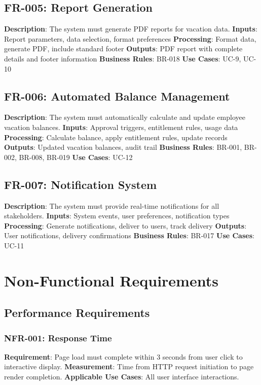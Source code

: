 \documentclass[12pt,a4paper]{article}
\begin{document}
\subsection{FR-005: Report Generation}
\textbf{Description}: The system must generate PDF reports for vacation data.
\textbf{Inputs}: Report parameters, data selection, format preferences
\textbf{Processing}: Format data, generate PDF, include standard footer
\textbf{Outputs}: PDF report with complete details and footer information
\textbf{Business Rules}: BR-018
\textbf{Use Cases}: UC-9, UC-10

\subsection{FR-006: Automated Balance Management}
\textbf{Description}: The system must automatically calculate and update employee vacation balances.
\textbf{Inputs}: Approval triggers, entitlement rules, usage data
\textbf{Processing}: Calculate balance, apply entitlement rules, update records
\textbf{Outputs}: Updated vacation balances, audit trail
\textbf{Business Rules}: BR-001, BR-002, BR-008, BR-019
\textbf{Use Cases}: UC-12

\subsection{FR-007: Notification System}
\textbf{Description}: The system must provide real-time notifications for all stakeholders.
\textbf{Inputs}: System events, user preferences, notification types
\textbf{Processing}: Generate notifications, deliver to users, track delivery
\textbf{Outputs}: User notifications, delivery confirmations
\textbf{Business Rules}: BR-017
\textbf{Use Cases}: UC-11

\section{Non-Functional Requirements}

\subsection{Performance Requirements}

\subsubsection{NFR-001: Response Time}
\textbf{Requirement}: Page load must complete within 3 seconds from user click to interactive display.
\textbf{Measurement}: Time from HTTP request initiation to page render completion.
\textbf{Applicable Use Cases}: All user interface interactions.
\end{document}
